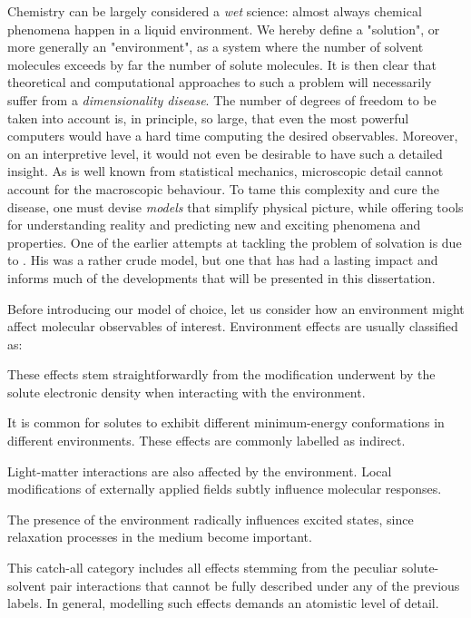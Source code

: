 Chemistry can be largely considered a \emph{wet} science: almost always
chemical phenomena happen in a liquid environment.\autocite{Reichardt2010-le}
We hereby define a "solution", or more generally an "environment", as
a system where the number of solvent molecules exceeds by far the number
of solute molecules.\autocite{Tomasi2004-dc, Tomasi2007-es}
It is then clear that theoretical and computational approaches to such a
problem will necessarily suffer from a \emph{dimensionality disease}.
The number of degrees of freedom to be taken into account is, in
principle, so large, that even the most powerful computers
would have a hard time computing the desired observables.
Moreover, on an interpretive level, it would not even be desirable to
have such a detailed insight.
As is well known from statistical mechanics, microscopic detail cannot
account for the macroscopic behaviour.\autocite{Hill1960-ql,
Hansen2013-io}
To tame this complexity and cure the disease, one must devise
\emph{models} that simplify physical picture, while offering tools for
understanding reality and predicting new and exciting
phenomena and properties.\autocite{Anderson1972-ai, Winsberg2010-sy, Kovac2011-ew}
One of the earlier attempts at tackling the problem of solvation is due
to \citeauthor{Onsager1936-wf}. His was a rather crude model, but one
that has had a lasting impact and informs much of the developments that
will be presented in this dissertation.\autocite{Onsager1936-wf}

Before introducing our model of choice, let us consider how an
environment might affect molecular observables of interest.
Environment effects are usually classified as:
\begin{description}[leftmargin=2mm, font=\normalfont\scshape]
\item[Direct.]
  These effects stem straightforwardly from the modification underwent by
  the solute electronic density when interacting with the environment.
\item[Indirect.]
  It is common for solutes to exhibit different minimum-energy
  conformations in different environments. These effects are commonly
  labelled as indirect.
\item[Local field.]
  Light-matter interactions are also affected by the environment. Local
  modifications of externally applied fields subtly influence molecular
  responses.\autocite{Cammi1998-jp, Pipolo2014-sd}
\item[Dynamic.]
  The presence of the environment radically influences excited states,
  since relaxation processes in the medium become important.
\item[Specific.] This catch-all category includes all effects
  stemming from the peculiar solute-solvent pair interactions that
  cannot be fully described under any of the previous labels.
  In general, modelling such effects demands an atomistic level of
  detail.
\end{description}

